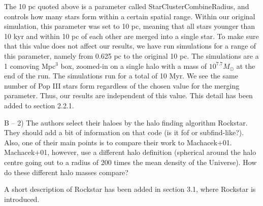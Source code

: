 \documentclass[11pt]{article}
\newenvironment{referee}[1][]{%
    \ignorespaces%
    \begin{mdframed}[style=myquotestyle,#1]%
}{%
    \end{mdframed}%
    \ignorespacesafterend%
}%
\begin{document}
The 10 pc quoted above is a parameter called StarClusterCombineRadius, and controls how many stars form within a certain spatial range. Within our original simulation, this parameter was set to 10 pc, meaning that all stars younger than 10 kyr and within 10 pc of each other are merged into a single star. To make sure that this value does not affect our results, we have run simulations for a range of this parameter, namely from 0.625 pc to the original 10 pc. The simulations are a 1 comoving Mpc$^3$ box, zoomed-in on a single halo with a mass of $10^{7.7} M_{\odot}$ at the end of the run.  The simulations run for a total of 10 Myr. We see the same number of Pop III stars form regardless of the chosen value for the merging parameter. Thus, our results are independent of this value. This detail has been added to section 2.2.1.


\begin{referee}
B -- 2) The authors select their haloes by the halo finding algorithm Rockstar. They should add a bit of information on that code (is it fof or subfind-like?). Also, one of their main points is to compare their work to Machacek+01. Machacek+01, however, use a different halo definition (spherical around the halo centre going out to a radius of 200 times the mean density of the Universe). How do these different halo masses compare?
\end{referee}

A short description of Rockstar has been added in section 3.1, where Rockstar is introduced.


\end{document}
